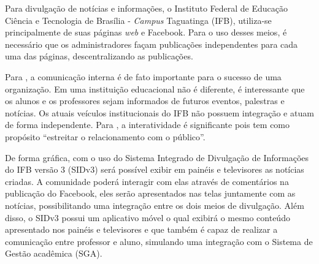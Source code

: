 Para divulgação de notícias e informações, o Instituto Federal de Educação Ciência e Tecnologia de Brasília - \textit{Campus} Taguatinga (IFB), utiliza-se principalmente de suas páginas \textit{web} e Facebook. Para o uso desses meios, é necessário que os administradores façam publicações independentes para cada uma das páginas, descentralizando as publicações.


Para \citet{pinheiro2010}, a comunicação interna é de fato importante para o sucesso de uma organização. Em uma instituição educacional não é diferente, é interessante que os alunos e os professores sejam informados de futuros eventos, palestras e notícias. Os atuais veículos institucionais do IFB não possuem integração e atuam de forma independente.%
Para \citet{santos2014}, a interatividade é significante pois tem como propósito ``estreitar o relacionamento com o público''.

De forma gráfica, com o uso do Sistema Integrado de Divulgação de Informações do IFB versão 3 (SIDv3) será possível exibir em painéis e televisores as notícias criadas. A comunidade poderá interagir com elas através de comentários na publicação do Facebook, eles serão apresentados nas telas juntamente com as notícias, possibilitando uma integração entre os dois meios de divulgação.  Além disso, o SIDv3 possui um aplicativo móvel o qual exibirá o mesmo conteúdo apresentado nos painéis e televisores e que também é capaz de realizar a comunicação entre professor e aluno, simulando uma integração com o Sistema de Gestão acadêmica (SGA).



